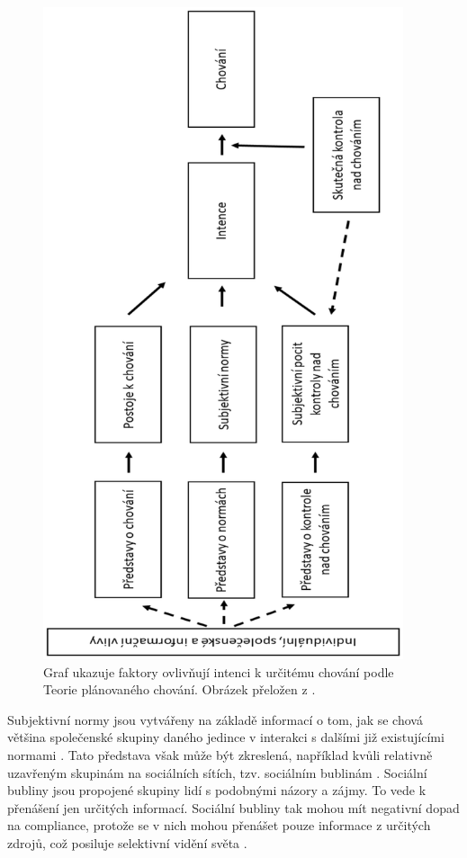 \begin{figure}
\begin{center}
    \includegraphics[angle=270,width=300pt]{./pic/Ajzen2-cs.eps}
    
    \caption{Graf ukazuje faktory ovlivňují intenci k určitému chování podle Teorie plánovaného chování. Obrázek přeložen z \cite{Ajzen2018}.}
    \label{fig:graph}
\end{center}
\end{figure}

Subjektivní normy jsou vytvářeny na základě informací o tom, jak se chová většina společenské skupiny daného jedince v interakci s dalšími již existujícími normami \cite{Ajzen1991}. Tato představa však může být zkreslená, například kvůli relativně uzavřeným skupinám na sociálních sítích, tzv. sociálním bublinám \cite{Gonzalez-Padilla2020}. Sociální bubliny jsou propojené skupiny lidí s podobnými názory a zájmy. To vede k přenášení jen určitých informací. Sociální bubliny tak mohou mít negativní dopad na compliance, protože se v nich mohou přenášet pouze informace z určitých zdrojů, což posiluje selektivní vidění světa \cite{Gonzalez-Padilla2020,Pariser2012TheFB}. 

